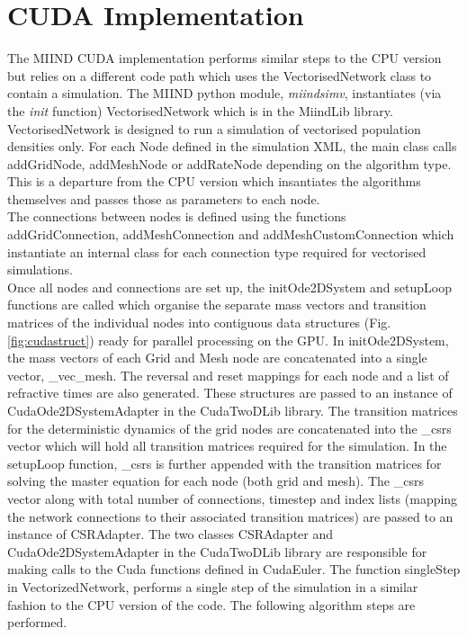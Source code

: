 \documentclass[utf8]{frontiers_suppmat} %
\begin{document}
\section{CUDA Implementation}
\label{cudaimplement}
The MIIND CUDA implementation performs similar steps to the CPU version but relies on a different code path which uses the VectorisedNetwork class to contain a simulation. The MIIND python module, \textit{miindsimv}, instantiates (via the \textit{init} function) VectorisedNetwork which is in the MiindLib library. VectorisedNetwork is designed to run a simulation of vectorised population densities only. For each Node defined in the simulation XML, the main class calls addGridNode, addMeshNode or addRateNode depending on the algorithm type. This is a departure from the CPU version which insantiates the algorithms themselves and passes those as parameters to each node.\\
The connections between nodes is defined using the functions addGridConnection, addMeshConnection and addMeshCustomConnection which instantiate an internal class for each connection type required for vectorised simulations.\\
Once all nodes and connections are set up, the initOde2DSystem and setupLoop functions are called which organise the separate mass vectors and transition matrices of the individual nodes into contiguous data structures (Fig. \ref{fig:cudastruct}) ready for parallel processing on the GPU. In initOde2DSystem, the mass vectors of each Grid and Mesh node are concatenated into a single vector, \_vec\_mesh. The reversal and reset mappings for each node and a list of refractive times are also generated. These structures are passed to an instance of CudaOde2DSystemAdapter in the CudaTwoDLib library. The transition matrices for the deterministic dynamics of the grid nodes are concatenated into the \_csrs vector which will hold all transition matrices required for the simulation. In the setupLoop function, \_csrs is further appended with the transition matrices for solving the master equation for each node (both grid and mesh). The \_csrs vector along with total number of connections, timestep and index lists (mapping the network connections to their associated transition matrices) are passed to an instance of CSRAdapter. The two classes CSRAdapter and CudaOde2DSystemAdapter in the CudaTwoDLib library are responsible for making calls to the Cuda functions defined in CudaEuler. The function singleStep in VectorizedNetwork, performs a single step of the simulation in a similar fashion to the CPU version of the code. The following algorithm steps are performed.\\
\end{document}

